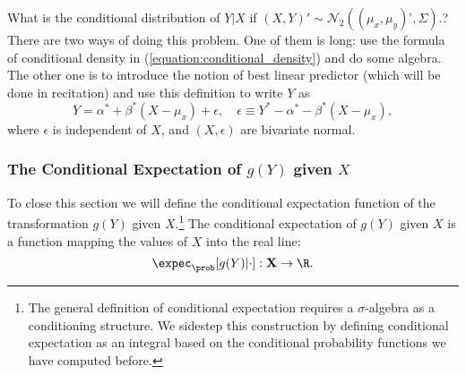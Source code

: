 \documentclass[11pt]{article} %
\begin{document}
\begin{prproblem}
What is the conditional distribution of $Y | X$ if $(X,Y)' \sim \mathcal{N}_2((\mu_x, \mu_y)’, \Sigma)$.? \\

 There are two ways of doing this problem. One of them is long: use the formula of conditional density in (\ref{equation:conditional_density}) and do some algebra. The other one is to introduce the notion of best linear predictor (which will be done in recitation) and use this definition to write $Y$ as
\[ Y = \alpha^* + \beta^*(X-\mu_x) + \epsilon, \quad \epsilon \equiv Y^* - \alpha^* - \beta^*(X-\mu_x), \]
where $\epsilon$ is independent of $X$, and $(X,\epsilon)$ are bivariate normal. 
\end{prproblem}

\subsubsection{The Conditional Expectation of $g(Y)$ given $X$ }
To close this section we will define the conditional expectation function of the transformation $g(Y)$ given $X$.\footnote{The general definition of conditional expectation requires a $\sigma$-algebra as a conditioning structure. We sidestep this construction by defining conditional expectation as an integral based on the conditional probability functions we have computed before.} The conditional expectation of $g(Y)$ given $X$ is a function mapping the values of $X$ into the real line:
$$\expec_{\prob}[g(Y) | \cdot]: \mathbf{X} \rightarrow \R.$$ 
\end{document}
